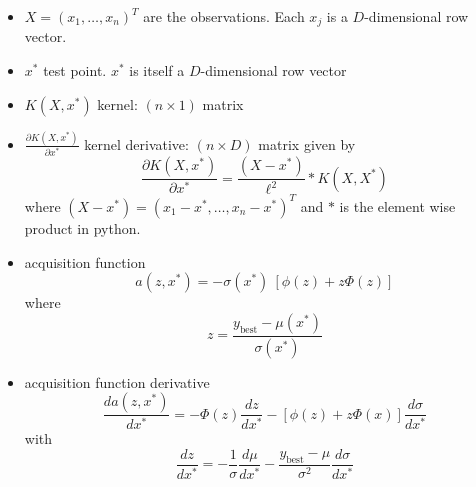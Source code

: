 \documentclass[11pt, oneside]{article}   	%
\begin{document}
\begin{itemize}
\item $X = (x_1, \dots, x_n)^T$ are the observations. Each $x_j$ is a $D$-dimensional row vector.
\item $x^*$ test point. $x^*$ is itself a $D$-dimensional row vector
\item $K(X, x^*)$ kernel: $(n \times 1)$ matrix
\item $\frac{\partial K(X, x^*)}{\partial x^*}$ kernel derivative: $(n \times D)$ matrix given by
\begin{equation}
\frac{\partial K(X, x^*)}{\partial x^*} = \frac{(X - x^*)}{\ell^2} * K(X, X^*)
\end{equation}
where $(X - x^*) = (x_1 - x^*, \dots, x_n - x^*)^T$ and $*$ is the element wise product in python.


\item acquisition function
$$ a(z, x^*) = -\sigma(x^*) \ \left[ \phi(z)  + z \Phi(z)\right]$$
where $$z=\frac{y_\text{best} - \mu(x^*)}{\sigma(x^*)}$$

\item acquisition function derivative
$$\frac{d{a(z, x^*)}}{d x^*} = -\Phi(z) \frac{d z}{d x^*} - \left[\phi(z) +z \Phi(x)\right] \frac{d{\sigma}}{d x^*}$$
with
$$ \frac{d z}{d x^*} = -\frac{1}{\sigma} \frac{d \mu}{d x^*} - \frac{y_\text{best} - \mu}{\sigma^2} \frac{d{\sigma}}{d x^*}$$
\end{itemize}
\end{document}
